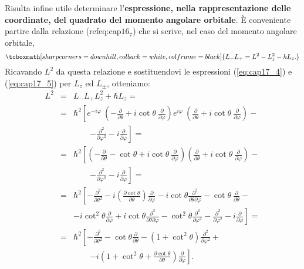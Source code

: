 \documentclass[a4paper,12pt,oneside]{book}
\begin{document}
Risulta infine utile determinare l'\textbf{espressione, nella rappresentazione delle coordinate, del quadrato del momento angolare orbitale}. È conveniente partire dalla relazione (refeq:cap$16_7$) che si scrive, nel caso del momento angolare orbitale,
	\begin{equation}
		\tcboxmath[sharp corners=downhill, colback=white, colframe=black]{
			L_- L_+ = L^2 -L_z ^2 -\hbar L_z .
			}
	\end{equation}
Ricavando $L^2$ da questa relazione e sostituendovi le espressioni (\ref{eq:cap17_4}) e (\ref{eq:cap17_5}) per $L_z$ ed $L_{\pm}$, otteniamo:
\begin{eqnarray}
L^2 &=& L_-L_+ L_z^2 +\hbar L_z = \nonumber \\
&=& \hbar ^2 \left[e^{-i\varphi}\ \left(-\frac{\partial}{\partial \theta}+i \cot \theta\ \frac{\partial}{\partial \varphi}\right)e^{i\varphi}\ \left(\frac{\partial}{\partial \theta}+i \cot \theta\ \frac{\partial}{\partial \varphi}\right)-\right. \nonumber \\
& &\qquad \left. -\frac{\partial ^2}{\partial \varphi ^2}- i\frac{\partial}{\partial \varphi}\right] = \nonumber \\
&=&\hbar ^ 2 \left[ \left( -\frac{\partial}{\partial \theta}-\cot\theta +i \cot\theta\ \frac{\partial}{\partial \varphi}\right)\left(\frac{\partial}{\partial \theta}+i \cot \theta \ \frac{\partial}{\partial \varphi}\right)-\right. \nonumber \\
& &\qquad \left. -\frac{\partial ^2}{\partial \varphi ^2}- i\frac{\partial}{\partial \varphi}\right] = \nonumber \\
&=& \hbar ^2 \left[ -\frac{\partial ^2}{\partial \theta ^2}-i\left( \frac{\partial \cot \theta}{\partial \theta}\right) \frac{\partial }{\partial \varphi }-i\cot \theta \frac{\partial ^2}{\partial \theta \partial \varphi}-\cot \theta\ \frac{\partial }{\partial \theta}-\right. \nonumber \\
& & \left. -i \cot ^2 \theta \frac{\partial }{\partial \varphi}+i \cot\theta \frac{\partial ^2}{\partial \theta \partial \varphi}-\cot ^2 \theta \frac{\partial ^2}{\partial \varphi ^2}-\frac{\partial ^2}{\partial \varphi ^2}-i\frac{\partial }{\partial \varphi}\right] = \nonumber \\
&=& \hbar^2 \left[ -\frac{\partial ^2}{\partial \theta ^2}-\cot \theta \frac{\partial }{\partial \theta}-\left(1+ \cot ^2 \theta\right) \frac{\partial ^2}{\partial \varphi ^2}+\right. \nonumber \\
& &\qquad \left. -i\left( 1+\cot ^2 \theta +\frac{\partial \cot \theta}{\partial \theta}\right)\frac{\partial}{\partial \varphi}\right] .
\end{eqnarray}
\end{document}
